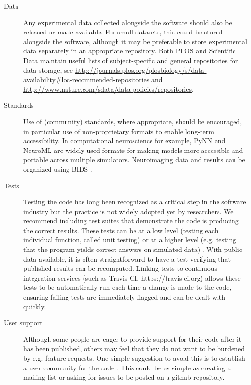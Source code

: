 \documentclass[11pt]{article}
\begin{document}
\begin{description}
\item [Data] Any experimental data collected alongside the software
  should also be released or made available.  For small datasets, this
  could be stored alongside the software, although it may be
  preferable to store experimental data separately in an appropriate
  repository.  Both PLOS and Scientific Data maintain useful lists of
  subject-specific and general repositories for data storage, see
  \url{http://journals.plos.org/plosbiology/s/data-availability#loc-recommended-repositories}
  and \url{http://www.nature.com/sdata/data-policies/repositories}.
  

  
\item [Standards] Use of (community) standards, where appropriate, should
  be encouraged, in particular use of non-proprietary formats
  to enable long-term accessibility.
  In computational neuroscience for example, PyNN
  \cite{Davison2009} and NeuroML \cite{CannonEtAl2014} are widely used
  formats for making models more accessible and portable across
  multiple simulators.  Neuroimaging data and results can be organized
  using BIDS \cite{Gorgolewski2016}.


\item [Tests] Testing the code has long been recognized
  as a critical step in the software industry but the practice is not
  widely adopted yet by researchers. We recommend including test
  suites that demonstrate the code is producing the correct
  results\cite{Axelrod2014-xi}. These tests can be at a low level
  (testing each individual function, called unit testing) or at a
  higher level (e.g. testing that the program yields correct answers
  on simulated data) \cite{wilson_best_2014}. With public data available,
  it is often straightforward to have a test verifying that published
  results can be recomputed. Linking tests to continuous 
  integration services (such as Travis CI, https://travis-ci.org) allows 
  these tests to be automatically run each time a change is made to the code,
  ensuring failing tests are immediately flagged and can be dealt with quickly.

\item [User support] Although some people are eager to provide support
  for their code after it has been published, others may feel that
  they do not want to be burdened by e.g. feature requests.  One
  simple suggestion to avoid this is to establish a user community for
  the code \cite{Gorgolewski2016b}.  This could be as simple as
  creating a mailing list or asking for issues to be posted on a
  github repository.

\end{description}
\end{document}
